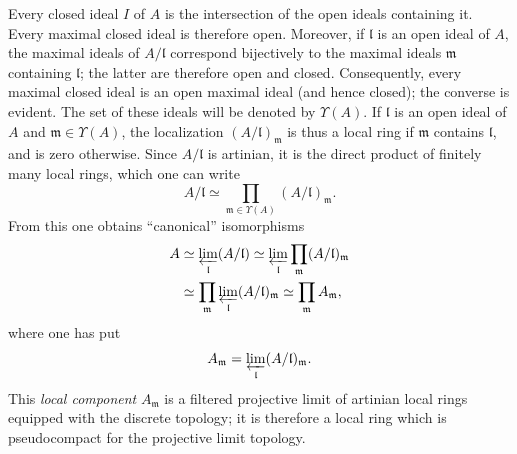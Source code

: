 Every closed ideal $I$ of $A$ is the intersection of the open ideals containing it. Every maximal closed ideal is therefore open. Moreover, if $\mathfrak l$ is an open ideal of $A$, the maximal ideals of $A/\mathfrak l$ correspond bijectively to the maximal ideals $\mathfrak m$ containing $\mathfrak l$; the latter are therefore open and closed. Consequently, every maximal closed ideal is an open maximal ideal (and hence closed); the converse is evident. The set of these ideals will be denoted by $\Upsilon(A)$.
If $\mathfrak l$ is an open ideal of $A$ and $\mathfrak m\in\Upsilon(A)$, the localization $(A/\mathfrak l)_{\mathfrak m}$ is thus a local ring if $\mathfrak m$ contains $\mathfrak l$, and is zero otherwise. Since $A/\mathfrak l$ is artinian, it is the direct product of finitely many local rings, which one can write
\[
A/\mathfrak l\simeq\prod_{\mathfrak m\in\Upsilon(A)}(A/\mathfrak l)_{\mathfrak m}.
\]
From this one obtains ``canonical'' isomorphisms
\[
\begin{aligned}
A&\simeq\varprojlim_{\mathfrak l}(A/\mathfrak l)
\simeq\varprojlim_{\mathfrak l}\prod_{\mathfrak m}(A/\mathfrak l)_{\mathfrak m}\\
&\simeq\prod_{\mathfrak m}\varprojlim_{\mathfrak l}(A/\mathfrak l)_{\mathfrak m}
\simeq\prod_{\mathfrak m}A_{\mathfrak m},
\end{aligned}
\]
where one has put
\[
A_{\mathfrak m}=\varprojlim_{\mathfrak l}(A/\mathfrak l)_{\mathfrak m}.
\]
This \emph{local component} $A_{\mathfrak m}$ is a filtered projective limit of artinian local rings equipped with the discrete topology; it is therefore a local ring which is pseudocompact for the projective limit topology.

